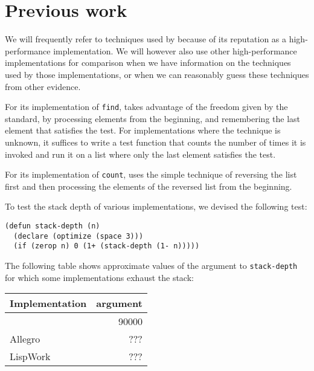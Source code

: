 \section{Previous work}

We will frequently refer to techniques used by \sbcl{} because of its
reputation as a high-performance implementation.  We will however also
use other high-performance implementations for comparison when we have
information on the techniques used by those implementations, or when
we can reasonably guess these techniques from other evidence.

For its implementation of \texttt{find}, \sbcl{} takes advantage of
the freedom given by the standard, by processing elements from the
beginning, and remembering the last element that satisfies the test.
For implementations where the technique is unknown, it suffices to
write a test function that counts the number of times it is invoked
and run it on a list where only the last element satisfies the test.

For its implementation of \texttt{count}, \sbcl{} uses the simple
technique of reversing the list first and then processing the elements
of the reversed list from the beginning.

To test the stack depth of various implementations, we devised the
following test:

\begin{verbatim}
(defun stack-depth (n)
  (declare (optimize (space 3)))
  (if (zerop n) 0 (1+ (stack-depth (1- n)))))
\end{verbatim}

The following table shows approximate values of the argument to
\texttt{stack-depth} for which some implementations exhaust the stack:

\begin{tabular}{|l|r|}
\hline
Implementation & argument\\
\hline
\hline
\sbcl{} & 90000\\
\hline
Allegro & ???\\
\hline
LispWork & ???\\
\hline
\end{tabular}
